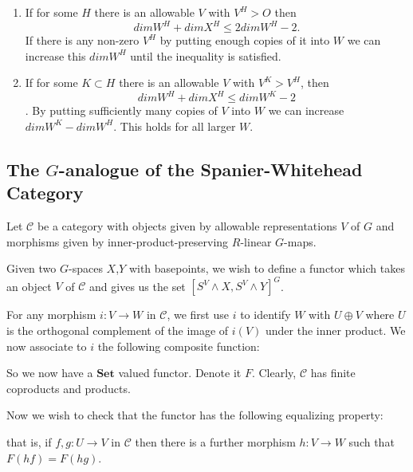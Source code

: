 \documentclass{article}
\theoremstyle{problemstyle}
\theoremstyle{problemstyle}
\theoremstyle{problemstyle}
\theoremstyle{problemstyle}
\theoremstyle{problemstyle}
\theoremstyle{problemstyle}
\begin{document}
\begin{enumerate}
\item If for some $H$ there is an allowable $V$ with $V^H > O$ then $$dim W^H + dim X^H \leq 2 dim W^H - 2.$$ If there is any non-zero $V^H$ by putting enough copies of it into $W$ we can increase this $dim W^H$ until the inequality is satisfied. 
\item If for some $K \subset H$ there is an allowable $V$ with $V^K > V^H$, then $$dim W^H + dim X^H \leq dim W^K - 2$$. By putting sufficiently many copies of $V$ into $W$ we can increase $dim W^K - dim W^H$. This holds for all larger $W$. 
\end{enumerate}

\subsection{The $G$-analogue of the Spanier-Whitehead Category}

Let $\mathcal{C}$ be a category with objects given by allowable representations $V$ of $G$ and morphisms given by inner-product-preserving $R$-linear $G$-maps.

Given two $G$-spaces $X$,$Y$ with basepoints, we wish to define a functor which takes an object $V$ of $\mathcal{C}$ and gives us the set $[S^V \wedge X,S^V \wedge Y]^G$. 

For any morphism $i:V \rightarrow W$ in $\mathcal{C}$, we first use $i$ to identify $W$ with $U \oplus V$ where $U$ is the orthogonal complement of the image of $i(V)$ under the inner product. We now associate to $i$ the following composite function:

\begin{center}
\end{center}

So we now have a $\textbf{Set}$ valued functor. Denote it $F$. Clearly, $\mathcal{C}$ has finite coproducts and products. 

Now we wish to check that the functor has the following equalizing property:

that is, if $f,g:U\rightarrow V$ in $\mathcal{C}$ then there is a further morphism $h:V\rightarrow W$ such that $F(hf) = F(hg)$. 
\end{document}
